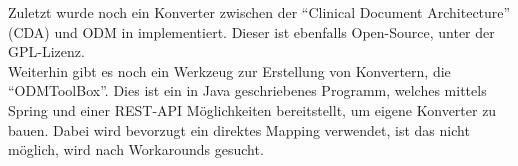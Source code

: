 Zuletzt wurde noch ein Konverter zwischen der \enquote{Clinical Document Architecture} (CDA) und ODM in  implementiert\cite{odm2cda}.
Dieser ist ebenfalls Open-Source, unter der GPL-Lizenz.\\

Weiterhin gibt es noch ein Werkzeug zur Erstellung von Konvertern, die \enquote{ODMToolBox}\cite{odmtoolbox}.
Dies ist ein in Java geschriebenes Programm, welches mittels Spring und einer REST-API Möglichkeiten bereitstellt, um eigene Konverter zu bauen.
Dabei wird bevorzugt ein direktes Mapping verwendet, ist das nicht möglich, wird nach Workarounds gesucht.
